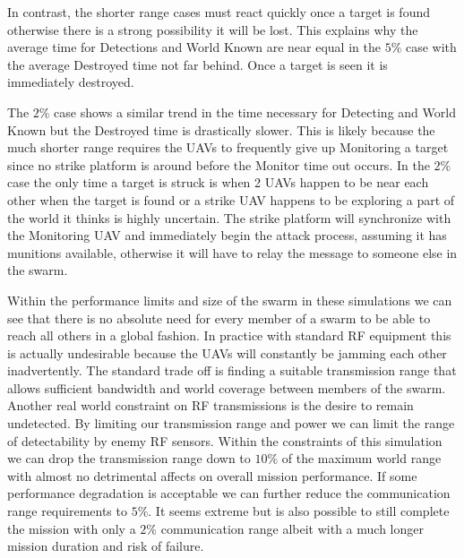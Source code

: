 \begin{multicols*}{2}

In contrast, the shorter range cases must react quickly once a target is found otherwise there is a strong possibility it will be lost.  This explains why the average time for Detections and World Known are near equal in the $5\%$ case with the average Destroyed time not far behind.  Once a target is seen it is immediately destroyed.

The $2\%$ case shows a similar trend in the time necessary for Detecting and World Known but the Destroyed time is drastically slower.  This is likely because the much shorter range requires the UAVs to frequently give up Monitoring a target since no strike platform is around before the Monitor time out occurs.  In the $2\%$ case the only time a target is struck is when 2 UAVs happen to be near each other when the target is found or a strike UAV happens to be exploring a part of the world it thinks is highly uncertain.  The strike platform will synchronize with the Monitoring UAV and immediately begin the attack process, assuming it has munitions available, otherwise it will have to relay the message to someone else in the swarm.

Within the performance limits and size of the swarm in these simulations we can see that there is no absolute need for every member of a swarm to be able to reach all others in a global fashion.  In practice with standard RF equipment this is actually undesirable because the UAVs will constantly be jamming each other inadvertently.  The standard trade off is finding a suitable transmission range that allows sufficient bandwidth and world coverage between members of the swarm.  Another real world constraint on RF transmissions is the desire to remain undetected.  By limiting our transmission range and power we can limit the range of detectability by enemy RF sensors.  Within the constraints of this simulation we can drop the transmission range down to $10\%$ of the maximum world range with almost no detrimental affects on overall mission performance.  If some performance degradation is acceptable we can further reduce the communication range requirements to $5\%$.  It seems extreme but is also possible to still complete the mission with only a $2\%$ communication range albeit with a much longer mission duration and risk of failure.


\end{multicols*}
